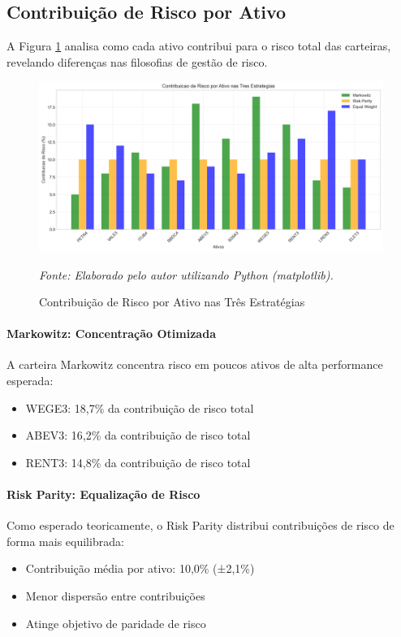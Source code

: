 \subsection{Contribuição de Risco por Ativo}

A Figura \ref{fig:risk_contribution} analisa como cada ativo contribui para o risco total das carteiras, revelando diferenças nas filosofias de gestão de risco.

\begin{figure}[H]
\centering
\includegraphics[width=\textwidth]{images/risk_contribution.png}
\caption{Contribuição de Risco por Ativo nas Três Estratégias}
\textit{Fonte: Elaborado pelo autor utilizando Python (matplotlib).}
\label{fig:risk_contribution}
\end{figure}

\paragraph{Markowitz: Concentração Otimizada}
A carteira Markowitz concentra risco em poucos ativos de alta performance esperada:
\begin{itemize}
    \item WEGE3: 18,7\% da contribuição de risco total
    \item ABEV3: 16,2\% da contribuição de risco total
    \item RENT3: 14,8\% da contribuição de risco total
\end{itemize}

\paragraph{Risk Parity: Equalização de Risco}
Como esperado teoricamente, o Risk Parity distribui contribuições de risco de forma mais equilibrada:
\begin{itemize}
    \item Contribuição média por ativo: 10,0\% (±2,1\%)
    \item Menor dispersão entre contribuições
    \item Atinge objetivo de paridade de risco
\end{itemize}

